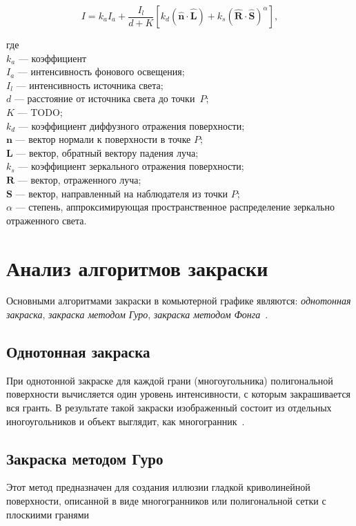     \begin{equation}
    	\label{eq:local_light_model}
    	I = k_aI_a + \frac{I_l}{d + K}[k_d(\mathbf{\hat{n}\cdot \hat{L}})+k_s(\mathbf{\hat{R}\cdot \hat{S}})^\alpha],
    \end{equation}
    
    где \\
    $k_a$ --- коэффициент \\
    $I_a$ --- интенсивность фонового освещения; \\
    $I_l$ --- интенсивность источника света; \\
    $d$ --- расстояние от источника света до точки~$P$; \\
    $K$ --- TODO; \\
    $k_d$ --- коэффициент диффузного отражения поверхности; \\
    $\mathbf{n}$ --- вектор нормали к поверхности в точке $P$; \\
    $\mathbf{L}$ --- вектор, обратный вектору падения луча; \\
    $k_s$ --- коэффициент зеркального отражения поверхности; \\
    $\mathbf{R}$ --- вектор, отраженного луча; \\
    $\mathbf{S}$ --- вектор, направленный на наблюдателя из точки $P$; \\
    $\alpha$ --- степень, аппроксимирующая пространственное распределение зеркально отраженного света.
        
    \section{Анализ алгоритмов закраски}
    
    Основными алгоритмами закраски в комьютерной графике являются: \textit{однотонная закраска}, \textit{закраска методом Гуро}, \textit{закраска методом Фонга}~\cite{rogers}. 
    
    \subsection{Однотонная закраска}
    При однотонной закраске для каждой грани (многоугольника) полигональной поверхности вычисляется один уровень интенсивности, с которым закрашивается вся гранть. В результате такой закраски изображенный состоит из отдельных иногоугольников и объект выглядит, как многогранник~\cite{rogers}.
    
    \subsection{Закраска методом Гуро}
    Этот метод предназначен для создания иллюзии гладкой криволинейной поверхности, описанной в виде многогранников или полигональной сетки с плоскиими гранями\cite{rogers,porev,foley}
    

